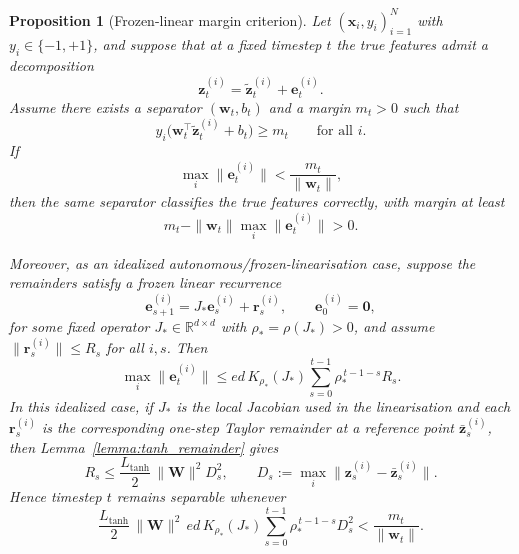 \documentclass{article}
\newtheorem{proposition}[theorem]{Proposition}
\theoremstyle{remark}
\newcommand{\R}{\mathbb{R}}
\newcommand{\bz}{\mathbf{z}}
\newcommand{\bx}{\mathbf{x}}
\newcommand{\bW}{\mathbf{W}}
\begin{document}
\begin{proposition}[Frozen-linear margin criterion]
\label{prop:margin_remainder}
Let $(\bx_i,y_i)_{i=1}^N$ with $y_i \in \{-1,+1\}$, and suppose that at a fixed
timestep $t$ the true features admit a decomposition
\[
  \bz_t^{(i)} = \tilde{\bz}_t^{(i)} + \mathbf{e}_t^{(i)}.
\]
Assume there exists a separator $(\mathbf{w}_t, b_t)$ and a margin $m_t > 0$
such that
\[
  y_i\bigl(\mathbf{w}_t^\top \tilde{\bz}_t^{(i)} + b_t\bigr) \geq m_t
  \qquad \text{for all } i.
\]
If
\[
  \max_i \|\mathbf{e}_t^{(i)}\| < \frac{m_t}{\|\mathbf{w}_t\|},
\]
then the same separator classifies the true features correctly, with margin at
least
\[
  m_t - \|\mathbf{w}_t\|\max_i \|\mathbf{e}_t^{(i)}\| > 0.
\]

Moreover, as an idealized autonomous/frozen-linearisation case, suppose the
remainders satisfy a frozen linear recurrence
\[
  \mathbf{e}_{s+1}^{(i)} = J_\ast \mathbf{e}_s^{(i)} + \mathbf{r}_s^{(i)},
  \qquad \mathbf{e}_0^{(i)} = \mathbf{0},
\]
for some fixed operator $J_\ast \in \R^{d \times d}$ with
$\rho_\ast = \rho(J_\ast) > 0$, and assume
$\|\mathbf{r}_s^{(i)}\| \leq R_s$ for all $i,s$. Then
\begin{equation}
  \max_i \|\mathbf{e}_t^{(i)}\|
  \leq e d\,K_{\rho_\ast}(J_\ast)
  \sum_{s=0}^{t-1} \rho_\ast^{\,t-1-s} R_s.
  \label{eq:margin_remainder_generic}
\end{equation}
In this idealized case, if $J_\ast$ is the local Jacobian used in the
linearisation and each $\mathbf{r}_s^{(i)}$ is the corresponding one-step
Taylor remainder at a reference point $\bar{\bz}_s^{(i)}$, then
Lemma~\ref{lemma:tanh_remainder} gives
\[
  R_s \leq \frac{L_{\tanh}}{2}\,\|\bW\|^2 D_s^2,
  \qquad
  D_s := \max_i \|\bz_s^{(i)} - \bar{\bz}_s^{(i)}\|.
\]
Hence timestep $t$ remains separable whenever
\begin{equation}
  \frac{L_{\tanh}}{2}\,\|\bW\|^2\,e d\,K_{\rho_\ast}(J_\ast)
  \sum_{s=0}^{t-1} \rho_\ast^{\,t-1-s} D_s^2
  < \frac{m_t}{\|\mathbf{w}_t\|}.
  \label{eq:tanh_margin_condition}
\end{equation}
\end{proposition}
\end{document}
